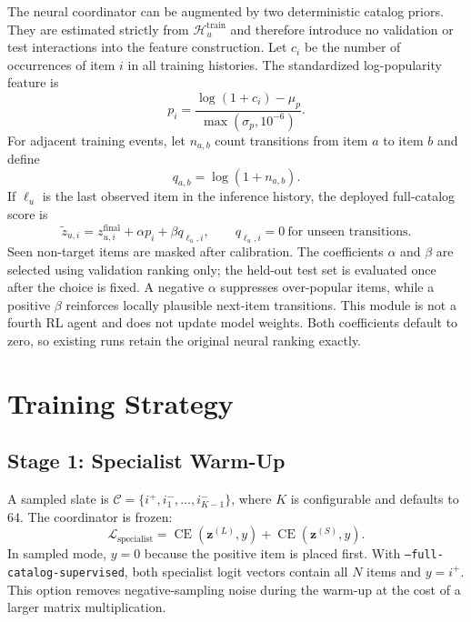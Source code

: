 \documentclass[11pt,a4paper]{article}
\begin{document}
The neural coordinator can be augmented by two deterministic catalog priors.
They are estimated strictly from $\mathcal H_u^{\mathrm{train}}$ and therefore
introduce no validation or test interactions into the feature construction.
Let $c_i$ be the number of occurrences of item $i$ in all training histories.
The standardized log-popularity feature is
\begin{equation}
  p_i=
  \frac{\log(1+c_i)-\mu_p}{\max(\sigma_p,10^{-6})}.
\end{equation}
For adjacent training events, let $n_{a,b}$ count transitions from item $a$ to
item $b$ and define
\begin{equation}
  q_{a,b}=\log(1+n_{a,b}).
\end{equation}
If $\ell_u$ is the last observed item in the inference history, the deployed
full-catalog score is
\begin{equation}
  \widetilde z_{u,i}
  =
  z_{u,i}^{\mathrm{final}}
  +\alpha p_i
  +\beta q_{\ell_u,i},
  \qquad q_{\ell_u,i}=0\ \text{for unseen transitions}.
\end{equation}
Seen non-target items are masked after calibration. The coefficients $\alpha$
and $\beta$ are selected using validation ranking only; the held-out test set
is evaluated once after the choice is fixed. A negative $\alpha$ suppresses
over-popular items, while a positive $\beta$ reinforces locally plausible
next-item transitions. This module is not a fourth RL agent and does not update
model weights. Both coefficients default to zero, so existing runs retain the
original neural ranking exactly.

\section{Training Strategy}

\subsection{Stage 1: Specialist Warm-Up}

A sampled slate is $\mathcal C=\{i^+,i_1^-,\ldots,i_{K-1}^-\}$,
where $K$ is configurable and defaults to 64. The coordinator is frozen:
\begin{equation}
  \mathcal L_{\mathrm{specialist}}
  =
  \operatorname{CE}(\bm z^{(L)},y)
  +\operatorname{CE}(\bm z^{(S)},y).
\end{equation}
In sampled mode, $y=0$ because the positive item is placed first. With
\texttt{--full-catalog-supervised}, both specialist logit vectors contain all
$N$ items and $y=i^+$. This option removes negative-sampling noise during the
warm-up at the cost of a larger matrix multiplication.
\end{document}
